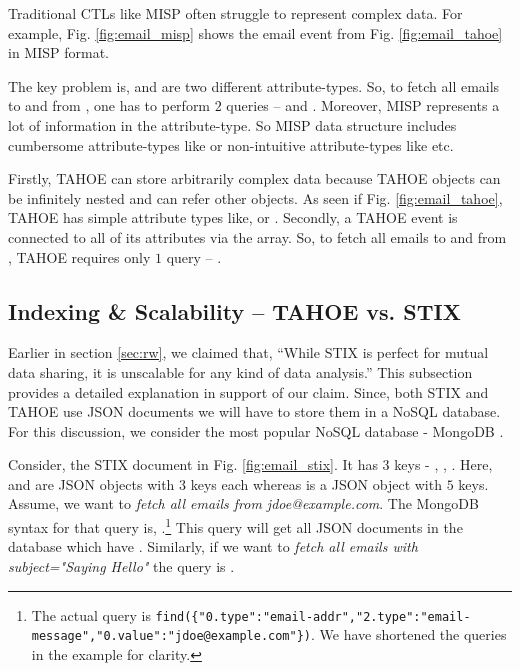 Traditional CTLs like MISP often struggle to represent complex data. For example, Fig. \ref{fig:email_misp} shows the email event from Fig. \ref{fig:email_tahoe} in MISP \cite{dulaunoy-misp-core-format-13} format.

The key problem is,  and  are two different attribute-types. So, to fetch all emails to and from , one has to perform $2$ queries --  and . Moreover, MISP represents a lot of information in the attribute-type. So MISP data structure includes cumbersome attribute-types like  or non-intuitive attribute-types like  etc.

Firstly, TAHOE can store arbitrarily complex data because TAHOE objects can be infinitely nested and can refer other objects. As seen if Fig. \ref{fig:email_tahoe}, TAHOE has simple attribute types like,  or . Secondly, a TAHOE event is connected to all of its attributes via the  array. So, to fetch all emails to and from , TAHOE requires only $1$ query -- .



\subsection{Indexing \& Scalability -- TAHOE vs. STIX}\label{ss:tahoeVstix}

Earlier in section \ref{sec:rw}, we claimed that, ``While STIX is perfect for mutual data sharing, it is unscalable for any kind of data analysis.'' This subsection provides a detailed explanation in support of our claim. Since, both STIX and TAHOE use JSON documents we will have to store them in a NoSQL database. For this discussion, we consider the most popular NoSQL database - MongoDB \cite{banker2011mongodb}.

Consider, the STIX document in Fig. \ref{fig:email_stix}. It has $3$ keys - , , . Here,  and  are JSON objects with $3$ keys each whereas  is a JSON object with $5$ keys. Assume, we want to \textit{fetch all emails from jdoe@example.com}. The MongoDB syntax for that query is, .\footnote{The actual query is \texttt{find(\{"0.type":"email-addr","2.type":"email-message","0.value":"jdoe@example.com"\})}. We have shortened the queries in the example for clarity.} This query will get all JSON documents in the database which have . Similarly, if we want to \textit{fetch all emails with subject="Saying Hello"} the query is .

